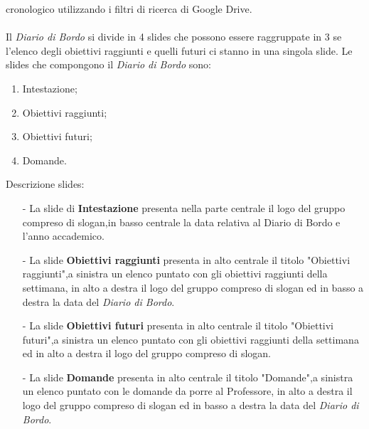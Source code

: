 cronologico utilizzando i filtri di ricerca di Google Drive.
\\\\
Il \textit{Diario di Bordo} si divide in 4 slides che possono essere raggruppate in 3 se l'elenco degli obiettivi raggiunti e quelli futuri ci stanno
in una singola slide.
Le slides che compongono il \textit{Diario di Bordo} sono:
\begin{enumerate}
    \item Intestazione;
    \item Obiettivi raggiunti;
    \item Obiettivi futuri;
    \item Domande.
\end{enumerate}
Descrizione slides:
\begin{itemize}
    \item [-] La slide di \textbf{Intestazione} presenta nella parte centrale il logo del gruppo compreso di slogan,in basso centrale la data relativa al Diario di Bordo e l'anno accademico.
    \item [-] La slide \textbf{Obiettivi raggiunti} presenta in alto centrale il titolo "Obiettivi raggiunti",a sinistra un elenco puntato con gli obiettivi raggiunti
    della settimana, in alto a destra il logo del gruppo compreso di slogan ed in basso a destra la data del \textit{Diario di Bordo}.
    \item [-] La slide \textbf{Obiettivi futuri} presenta in alto centrale il titolo "Obiettivi futuri",a sinistra un elenco puntato con gli obiettivi raggiunti
    della settimana ed in alto a destra il logo del gruppo compreso di slogan.
    \item [-] La slide \textbf{Domande} presenta in alto centrale il titolo "Domande",a sinistra un elenco puntato con le domande da porre al Professore, in alto a destra il logo del gruppo compreso di slogan ed in basso 
    a destra la data del \textit{Diario di Bordo}.
\end{itemize}